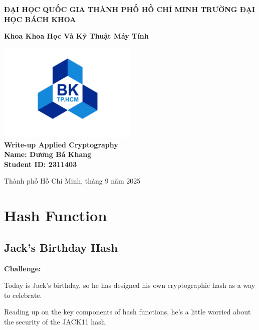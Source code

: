 \documentclass[12pt, a4paper, oneside]{report}
\begin{document}
{
\thispagestyle{empty} 
\centering
    \vspace*{1cm}
    
    \Large
    \textbf{ĐẠI HỌC QUỐC GIA THÀNH PHỐ HỒ CHÍ MINH TRƯỜNG ĐẠI HỌC BÁCH KHOA}
    
    \vspace{0.5cm}
    \Large
    \textbf{Khoa Khoa Học Và Kỹ Thuật Máy Tính}
    
    \vspace{0.5cm}
    
    \includegraphics[width=0.5\textwidth]{01_logobachkhoasang.png}\\
    \large
    \vspace{0.5cm}
    \textbf{Write-up Applied Cryptography}
    \vspace{0.5cm}
    \large
    \\
    \textbf{Name: Dương Bá Khang}
    \vspace{0.5cm}
    \\
    \textbf{Student ID: 2311403} 
    \vfill
    
    \normalsize
    Thành phố Hồ Chí Minh, tháng 9 năm 2025
    
}
\patchcmd{\chapter}{\thispagestyle{plain}}{\thispagestyle{fancy}}{}{}
\tableofcontents
\newpage

\chapter{Hash Function}
\section{Jack's Birthday Hash}
\textbf{Challenge:}

Today is Jack's birthday, so he has designed his own cryptographic hash as a way to celebrate.

Reading up on the key components of hash functions, he's a little worried about the security of the JACK11 hash.
\end{document}
